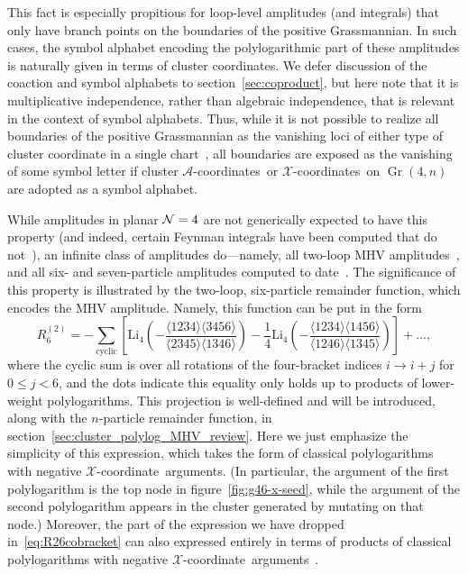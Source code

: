 \documentclass[12pt]{article}
\DeclareMathOperator{\Gr}{Gr}
\def\xcoord{$\mathcal{X}$-coordinate}
\def\xcoords{$\mathcal{X}$-coordinates}
\def\acoords{$\mathcal{A}$-coordinates}
\begin{document}
This fact is especially propitious for loop-level amplitudes (and integrals) that only have branch points on the boundaries of the positive Grassmannian. In such cases, the symbol alphabet encoding the polylogarithmic part of these amplitudes is naturally given in terms of cluster coordinates. We defer discussion of the coaction and symbol alphabets to section~\ref{sec:coproduct}, but here note that it is multiplicative independence, rather than algebraic independence, that is relevant in the context of symbol alphabets. Thus, while it is not possible to realize all boundaries of the positive Grassmannian as the vanishing loci of either type of cluster coordinate in a single chart~\cite{ArkaniHamed:2012nw}, all boundaries are exposed as the vanishing of some symbol letter if cluster \acoords\ or \xcoords\ on $\Gr(4,n)$ are adopted as a symbol alphabet.

While amplitudes in planar ${\cal N}=4$ are not generically expected to have this property (and indeed, certain Feynman integrals have been computed that do not~\cite{Bourjaily:2018aeq,Henn:2018cdp}), an infinite class of amplitudes do---namely, all two-loop MHV amplitudes~\cite{CaronHuot:2011ky}, and all six- and seven-particle amplitudes computed to date~\cite{CaronHuot:2011kk,Dixon:2014iba,Drummond:2014ffa,Dixon:2015iva,Caron-Huot:2016owq,Dixon:2016nkn}. The significance of this property is illustrated by the two-loop, six-particle remainder function, which encodes the MHV amplitude. Namely, this function can be put in the form
\begin{equation} \label{eq:R26cobracket}
	R^{(2)}_6 = -\sum_{\text{cyclic}} \left[ \text{Li}_4\left(-\frac{\langle 1234 \rangle \langle 3456 \rangle}{\langle 2345 \rangle \langle 1346 \rangle}\right) - \frac{1}{4} \text{Li}_4 \left(-\frac{\langle 1234 \rangle \langle 1456 \rangle}{\langle 1246 \rangle \langle 1345 \rangle}\right) \right] + \dots,
\end{equation}
where the cyclic sum is over all rotations of the four-bracket indices $i \rightarrow i+j$ for $0\leq j <6$, and the dots indicate this equality only holds up to products of lower-weight polylogarithms. This projection is well-defined and will be introduced, along with the $n$-particle remainder function, in section~\ref{sec:cluster_polylog_MHV_review}. Here we just emphasize the simplicity of this expression, which takes the form of classical polylogarithms with negative \xcoord\ arguments. (In particular, the argument of the first polylogarithm is the top node in figure~\ref{fig:g46-x-seed}, while the argument of the second polylogarithm appears in the cluster generated by mutating on that node.) Moreover, the part of the expression we have dropped in~\eqref{eq:R26cobracket} can also expressed entirely in terms of products of classical polylogarithms with negative \xcoord\ arguments~\cite{Golden:2014xqf}. 
\end{document}
